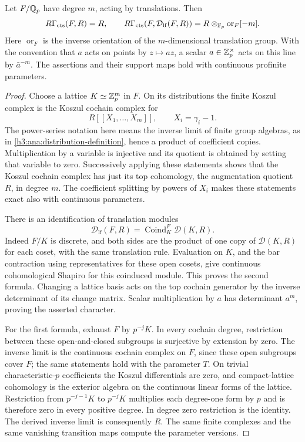 \begin{lemma}\label{h3:ana:translations}
Let $F/\mathbb Q_p$ have degree $m$, acting by translations.  Then
\[
 R\Gamma_{\mathrm{cts}}(F,R)=R,\qquad
 R\Gamma_{\mathrm{cts}}(F,\mathcal D_{\mathrm{lf}}(F,R))
       =R\otimes_{\mathbb F_p}\operatorname{or}_F[-m].
\]
Here $\operatorname{or}_F$ is the inverse orientation of the
$m$-dimensional translation group.  With the convention that
$a$ acts on points by $z\mapsto az$, a scalar
$a\in\mathbb Z_p^\times$ acts on this line by $\bar a^{-m}$.
The assertions and their support maps hold with continuous
profinite parameters.
\end{lemma}
\begin{proof}
Choose a lattice $K\simeq\mathbb Z_p^m$ in $F$.  On its distributions
the finite Koszul complex is the Koszul cochain complex for
\[
 R[[X_1,\ldots,X_m]],\qquad X_i=\gamma_i-1.
\]
The power-series notation here means the inverse limit of finite
group algebras, as in \eqref{h3:ana:distribution-definition}, hence
a product of coefficient copies.  Multiplication by a variable
is injective and its quotient is obtained by setting that
variable to zero.  Successively applying these statements
shows that the Koszul cochain complex has just its top
cohomology, the augmentation quotient $R$, in degree $m$.
The coefficient splitting by powers of $X_i$ makes these
statements exact also with continuous parameters.

There is an identification of translation modules
\[
 \mathcal D_{\mathrm{lf}}(F,R)
  =\operatorname{Coind}_{K}^{F}\mathcal D(K,R).
\]
Indeed $F/K$ is discrete, and both sides are the product of
one copy of $\mathcal D(K,R)$ for each coset, with the same
translation rule.  Evaluation on $K$, and the bar contraction
using representatives for these open cosets, give continuous
cohomological Shapiro for this coinduced module.  This proves
the second formula.  Changing a lattice basis acts on the
top cochain generator by the inverse determinant of its
change matrix.  Scalar multiplication by $a$ has determinant
$a^m$, proving the asserted character.

For the first formula, exhaust $F$ by $p^{-j}K$.  In every cochain
degree, restriction between these open-and-closed subgroups is
surjective by extension by zero.  The inverse limit is the continuous
cochain complex on $F$, since these open subgroups cover $F$; the same
statements hold with the parameter $T$.  On trivial
characteristic-$p$ coefficients the Koszul differentials
are zero, and compact-lattice cohomology is the exterior
algebra on the continuous linear forms of the lattice.
Restriction from $p^{-j-1}K$ to $p^{-j}K$ multiplies each
degree-one form by $p$ and is therefore zero in every positive
degree.  In degree zero restriction is the identity.
The derived inverse limit is consequently $R$.
The same finite complexes and the same vanishing transition
maps compute the parameter versions.
\end{proof}

